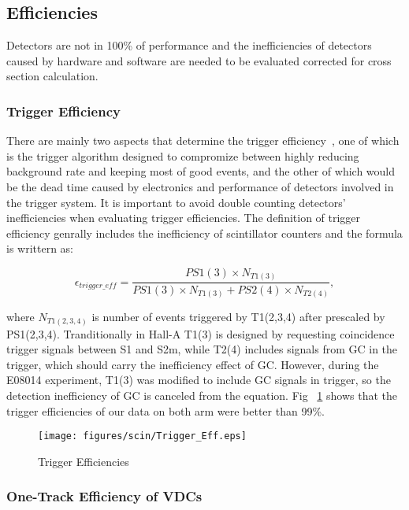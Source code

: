 \subsection{Efficiencies}

 Detectors are not in 100\% of performance and the inefficiencies of detectors caused by hardware and software are needed to be evaluated corrected for cross section calculation. 

\subsubsection{Trigger Efficiency}

 There are mainly two aspects that determine the trigger efficiency~\cite{R_Bock}, one of which is the trigger algorithm designed to compromize between highly reducing background rate and keeping most of good events, and the other of which would be the dead time caused by electronics and performance of detectors involved in the trigger system. It is important to avoid double counting detectors' inefficiencies when evaluating trigger efficiencies. The definition of trigger efficiency genrally includes the inefficiency of scintillator counters and the formula is writtern as:

\begin{equation}
 \epsilon_{trigger\_eff} = \frac{PS1(3)\times N_{T1(3)}}{PS1(3) \times N_{T1(3)}+PS2(4)\times N_{T2(4)}},
 \label{trigger_eff}
\end{equation}

where $N_{T1(2,3,4)}$ is number of events triggered by T1(2,3,4) after prescaled by PS1(2,3,4). Tranditionally in Hall-A T1(3) is designed by requesting coincidence trigger signals between S1 and S2m, while T2(4) includes signals from GC in the trigger, which should carry the inefficiency effect of GC. However, during the E08014 experiment, T1(3) was modified to include GC signals in trigger, so the detection inefficiency of GC is canceled from the equation. Fig ~\ref{trig_eff} shows that the trigger efficiencies of our data on both arm were better than 99\%.

\begin{figure}[h!]
\centerline{\texttt{[image: figures/scin/Trigger\_Eff.eps]}}
\caption[Trigger Efficiencies]{\footnotesize{Trigger Efficiencies}}
\label{trig_eff}
\end{figure}

\subsubsection{One-Track Efficiency of VDCs}

